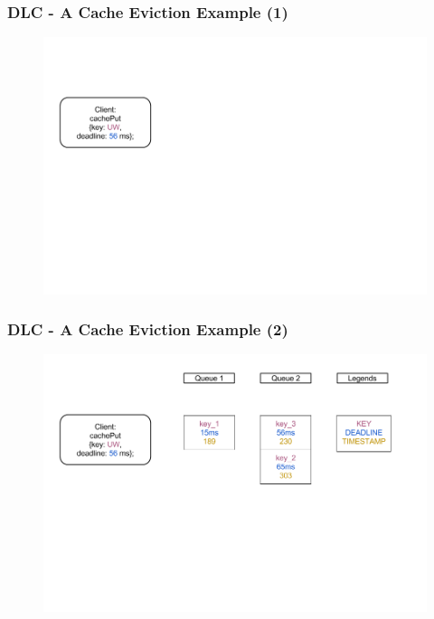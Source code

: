 \documentclass{beamer}
\begin{document}
\begin{frame}
  \frametitle{DLC - A Cache Eviction Example (1)}
  \begin{figure}
    \begin{center}
      \centerline{\includegraphics[scale=0.33]{img/DLC_V5_1.png}}
    \end{center}
  \end{figure}
\end{frame}


\begin{frame}
  \frametitle{DLC - A Cache Eviction Example (2)}
  \begin{figure}
    \begin{center}
      \centerline{\includegraphics[scale=0.33]{img/DLC_V5_2.png}}
    \end{center}
  \end{figure}
\end{frame}
\end{document}
